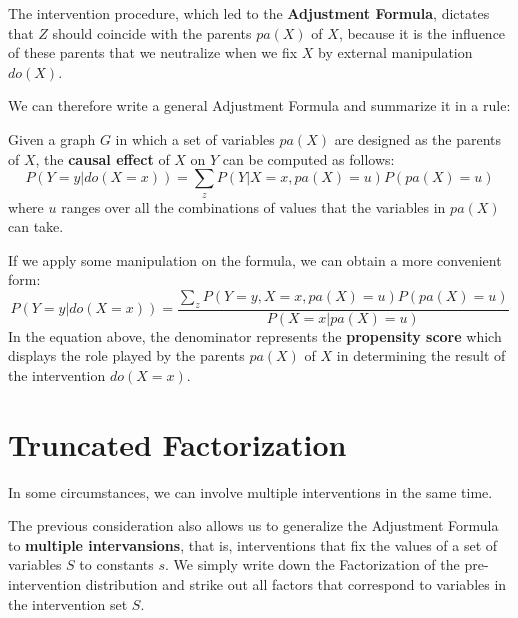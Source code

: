 The intervention procedure, which led to the \textbf{Adjustment Formula},
dictates that $Z$ should coincide with the parents $pa(X)$ of $X$, because it is
the influence of these parents that we neutralize when we fix $X$ by external
manipulation $do(X)$.

We can therefore write a general Adjustment Formula and summarize it in a rule:
\begin{definition}
      Given a graph $G$ in which a set of variables $pa(X)$ are designed as the
      parents of $X$, the \textbf{causal effect} of $X$ on $Y$ can be computed
      as follows:
      \begin{equation}
            P(Y = y| do(X = x)) = \sum_{z} P(Y | X = x, pa(X) = u)P(pa(X) = u)
      \end{equation}
      where $u$ ranges over all the combinations of values that the variables in
      $pa(X)$ can take.
\end{definition}
If we apply some manipulation on the formula, we can obtain a more convenient
form:
\begin{equation}
      P(Y = y| do(X = x)) = \frac{\sum_{z} P(Y = y, X = x, pa(X) = u)P(pa(X) = u)}{P(X = x | pa(X) = u)}
\end{equation}
In the equation above, the denominator represents the \textbf{propensity score}
which displays the role played by the parents $pa(X)$ of $X$ in determining the
result of the intervention $do(X = x)$.
\section{Truncated Factorization}
In some circumstances, we can involve multiple interventions in the same time.

The previous consideration also allows us to generalize the Adjustment Formula to
\textbf{multiple intervansions}, that is, interventions that fix the values of a
set of variables $S$ to constants $s$. We simply write down the Factorization of
the pre-intervention distribution and strike out all factors that correspond to
variables in the intervention set $S$.

